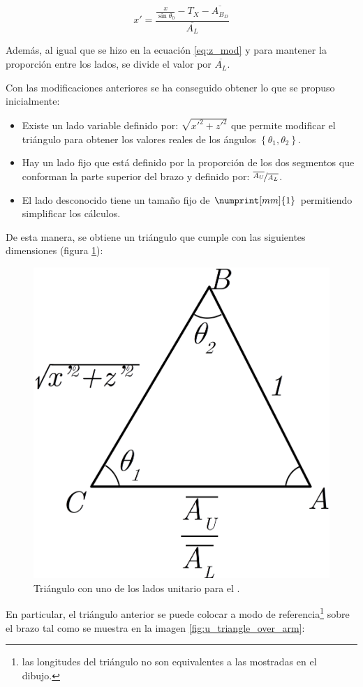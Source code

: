 \begin{equation}\label{eq:x_mod}
    x' = \frac{\frac{x}{\sin{\theta_0}} - T_X - \overline{A_{B_D}}}{\overline{A_L}}
\end{equation}

Además, al igual que se hizo en la ecuación \ref{eq:z_mod} y para mantener la proporción
entre los lados, se divide el valor por $\overline{A_L}$.

Con las modificaciones anteriores se ha conseguido obtener lo que se propuso
inicialmente:

\begin{itemize}
    \item Existe un lado variable definido por: $\sqrt{x'^2 + z'^2}$ que permite modificar
          el triángulo para obtener los valores reales de los ángulos $\left\{\theta_1, \theta_2\right\}$.
    \item Hay un lado fijo que está definido por la proporción de los dos segmentos
          que conforman la parte superior del brazo y definido por: $\nicefrac{\overline{A_U}}{\overline{A_L}}$.
    \item El lado desconocido tiene un tamaño fijo de $\numprint[mm]{1}$ permitiendo simplificar
          los cálculos.
\end{itemize}

De esta manera, se obtiene un triángulo que cumple con las siguientes dimensiones
(figura \ref{fig:unitary_triangle}):

\begin{figure}[H]
    \centering
    \includegraphics[width=.3\linewidth]{pictures/ik_unitary_triangle.png}
    \caption{Triángulo con uno de los lados unitario para el \pArm{}.}
    \label{fig:unitary_triangle}
\end{figure}

En particular, el triángulo anterior se puede colocar a modo de
referencia\footnote{las longitudes del triángulo no son equivalentes a las mostradas en el dibujo.}
sobre el brazo tal como se muestra en la imagen \ref{fig:u_triangle_over_arm}:

